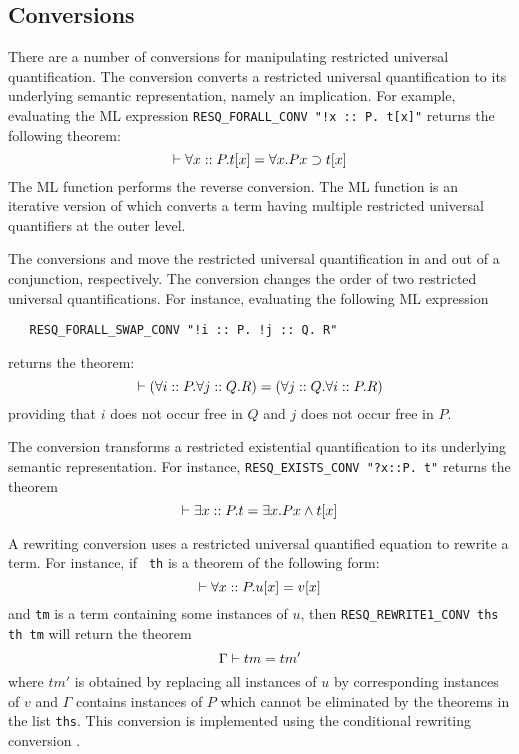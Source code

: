 \subsection{Conversions}

There are a number of conversions for manipulating restricted
universal quantification. The conversion 
converts a restricted universal quantification to its underlying
semantic representation, namely an implication. For example,
evaluating the ML expression
\verb|RESQ_FORALL_CONV "!x :: P. t[x]"| returns the following theorem:
\[
\THM \forall x :: P. t[x] = \forall x. P x \IMP t[x]
\]
The ML function
 performs the reverse conversion. The ML
function  is an iterative version of
 which converts a term having multiple
restricted universal quantifiers at the outer level.

The conversions  and
 move the restricted universal
quantification in and out of a conjunction, respectively.
The conversion \linebreak{} changes the order of two
restricted universal quantifications. For instance, evaluating the
following ML expression
\begin{verbatim}
   RESQ_FORALL_SWAP_CONV "!i :: P. !j :: Q. R"
\end{verbatim}
returns the theorem:
\[
\THM (\forall i :: P. \forall j :: Q. R) = (\forall j :: Q. \forall i :: P. R)
\]
providing that $i$ does not occur free in $Q$ and $j$ does not occur
free in $P$.

The conversion  transforms a restricted
existential quantification to its underlying semantic representation.
For instance, \verb|RESQ_EXISTS_CONV "?x::P. t"| returns the theorem
\[
\THM \exists x::P. t = \exists x. P x \AND t[x]
\]

A rewriting conversion  uses a restricted
universal quantified equation to rewrite a term. For instance, if {\tt
th} is a theorem of the following form:
\[
\THM \forall x::P. u[x] = v[x]
\]
and {\tt tm} is a term containing some instances of $u$,
then \verb|RESQ_REWRITE1_CONV ths th tm| will return the theorem
\[
\Gamma \THM tm = tm'
\]
where $tm'$ is obtained by replacing all instances of $u$ by
corresponding instances of $v$ and $\Gamma$ contains instances of $P$
which cannot be eliminated by the theorems in the list {\tt ths}. This
conversion is implemented using the conditional rewriting conversion
. 

